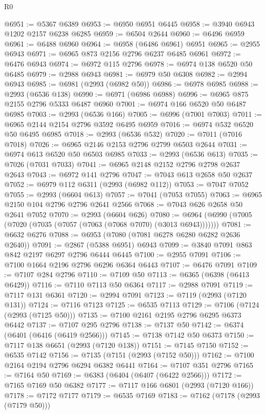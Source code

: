 \begin{lexlean}{R0}
\begin{coremodule}
@6951 := @5367 @6389
@6953 := @6950 @6951 @6445
@6958 := @3940 @6943 @1202 @2157 @6238 @6285
@6959 := @6504 @2644
@6960 := @6496 @6959
@6961 := @6488 @6960
@6964 := @6958 (@6486 @6961) @6951
@6965 := @2955 @6943
@6971 := @6965 @873 @2156 @2796 @6237 @6485 @6961
@6972 := @6476 @6943
@6974 := @6972 @115 @2796
@6978 := @6974 @138 @6520 @50 @6485
@6979 := @2988 @6943
@6981 := @6979 @50 @6308
@6982 := @2994 @6943
@6985 := @6981 (@2993 (@6982 @50))
@6986 := @6978 @6985
@6988 := @2993 (@6536 @138)
@6990 := @6971 (@6986 @6988)
@6996 := @6965 @875 @2155 @2796 @5333 @6487 @6960
@7001 := @6974 @166 @6520 @50 @6487 @6985
@7003 := @2993 (@6536 @166)
@7005 := @6996 (@7001 @7003)
@7011 := @6965 @2144 @2154 @2796 @3592 @6495 @6959
@7016 := @6974 @532 @6520 @50 @6495 @6985
@7018 := @2993 (@6536 @532)
@7020 := @7011 (@7016 @7018)
@7026 := @6965 @2146 @2153 @2796 @2799 @6503 @2644
@7031 := @6974 @613 @6520 @50 @6503 @6985
@7033 := @2993 (@6536 @613)
@7035 := @7026 (@7031 @7033)
@7041 := @6965 @2148 @2152 @2796 @2798 @2637 @2643
@7043 := @6972 @141 @2796
@7047 := @7043 @613 @2658 @50 @2637
@7052 := @6979 @112 @6311 (@2993 (@6982 @112))
@7053 := @7047 @7052
@7055 := @2993 (@6604 @613)
@7057 := @7041 (@7053 @7055)
@7063 := @6965 @2150 @104 @2796 @2796 @2641 @2566
@7068 := @7043 @626 @2658 @50 @2641 @7052
@7070 := @2993 (@6604 @626)
@7080 := @6964 (@6990 (@7005 (@7020 (@7035 (@7057 (@7063 (@7068 @7070) (@3013 @6943)))))))
@7081 := @6632 @6276
@7088 := @6953 (@7080 (@7081 @6278 @6280 @6282 @2636 @2640))
@7091 := @2867 (@5388 @6951) @6943
@7099 := @3840 @7091 @863 @842 @2197 @6297 @2796 @6444 @6445
@7100 := @2955 @7091
@7106 := @7100 @1664 @2196 @2796 @6296 @6364 @6443
@7107 := @6476 @7091
@7109 := @7107 @284 @2796
@7110 := @7109 @50
@7113 := @6365 (@6398 (@6413 @6429))
@7116 := @7110 @7113 @50 @6364
@7117 := @2988 @7091
@7119 := @7117 @131 @6361
@7120 := @2994 @7091
@7123 := @7119 (@2993 (@7120 @131))
@7124 := @7116 @7123
@7125 := @6535 @7113
@7129 := @7106 (@7124 (@2993 (@7125 @50)))
@7135 := @7100 @2161 @2195 @2796 @6295 @6373 @6442
@7137 := @7107 @295 @2796
@7138 := @7137 @50
@7142 := @6374 (@6401 (@6416 (@6419 @2566)))
@7145 := @7138 @7142 @50 @6373
@7150 := @7117 @138 @6651 (@2993 (@7120 @138))
@7151 := @7145 @7150
@7152 := @6535 @7142
@7156 := @7135 (@7151 (@2993 (@7152 @50)))
@7162 := @7100 @2164 @2194 @2796 @6294 @6382 @6441
@7164 := @7107 @351 @2796
@7165 := @7164 @50
@7169 := @6383 (@6404 (@6407 (@6422 @2566)))
@7172 := @7165 @7169 @50 @6382
@7177 := @7117 @166 @6801 (@2993 (@7120 @166))
@7178 := @7172 @7177
@7179 := @6535 @7169
@7183 := @7162 (@7178 (@2993 (@7179 @50)))

\end{coremodule}
\end{lexlean}
